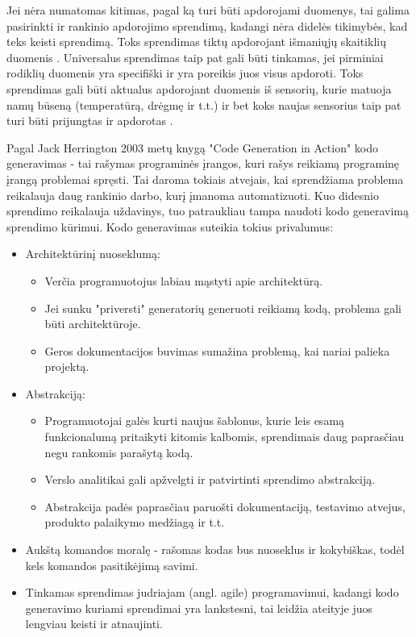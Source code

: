 \documentclass{VUMIFPSbakalaurinis}
\begin{document}
Jei nėra numatomas kitimas, pagal ką turi būti apdorojami duomenys, tai galima pasirinkti ir rankinio apdorojimo sprendimą, kadangi nėra didelės tikimybės, kad teks keisti sprendimą. Toks sprendimas tiktų apdorojant išmaniųjų skaitiklių duomenis \cite{skaitikliai}. Universalus sprendimas taip pat gali būti tinkamas, jei pirminiai rodiklių duomenis yra specifiški ir yra poreikis juos visus apdoroti. Toks sprendimas gali būti aktualus apdorojant duomenis iš sensorių, kurie matuoja namų būseną (temperatūrą, drėgmę ir t.t.) ir bet koks naujas sensorius taip pat turi būti prijungtas ir apdorotas \cite{yang2017iot}. \par
Pagal Jack Herrington 2003 metų knygą "Code Generation in Action" kodo generavimas - tai rašymas programinės įrangos, kuri rašys reikiamą programinę įrangą problemai spręsti. Tai daroma tokiais atvejais, kai sprendžiama problema reikalauja daug rankinio darbo, kurį įmanoma automatizuoti. Kuo didesnio sprendimo reikalauja uždavinys, tuo patraukliau tampa naudoti kodo generavimą sprendimo kūrimui. Kodo generavimas suteikia tokius privalumus: 
\begin{itemize}
    \item Architektūrinį nuoseklumą: 
    \begin{itemize}
        \item Verčia programuotojus labiau mąstyti apie architektūrą.
        \item Jei sunku "priversti" generatorių generuoti reikiamą kodą, problema gali būti architektūroje.
        \item Geros dokumentacijos buvimas sumažina problemą, kai nariai palieka projektą.
    \end{itemize}
    \item Abstrakciją:
    \begin{itemize}
        \item Programuotojai galės kurti naujus šablonus, kurie leis esamą funkcionalumą pritaikyti kitomis kalbomis, sprendimais daug paprasčiau negu rankomis parašytą kodą.
        \item Verslo analitikai gali apžvelgti ir patvirtinti sprendimo abstrakciją.
        \item Abstrakcija padės paprasčiau paruošti dokumentaciją, testavimo atvejus, produkto palaikymo medžiagą ir t.t.  
    \end{itemize}
    \item Aukštą komandos moralę - rašomas kodas bus nuoseklus ir kokybiškas, todėl kels komandos pasitikėjimą savimi.
    \item Tinkamas sprendimas judriajam (angl. agile) programavimui, kadangi kodo generavimo kuriami sprendimai yra lankstesni, tai leidžia ateityje juos lengviau keisti ir atnaujinti.   
\end{itemize} 
\end{document}
